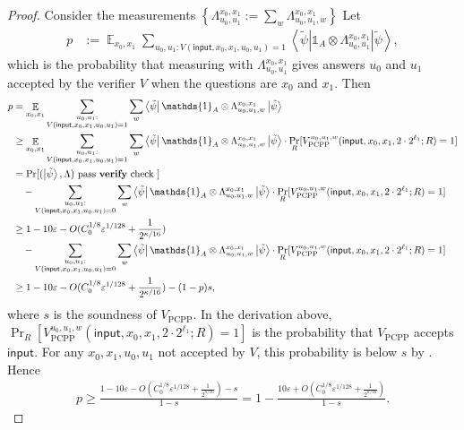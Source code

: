 \documentclass[11pt]{article}
\def\V{\CMcal{V}}
\theoremstyle{plain}
\theoremstyle{definition}
\newcommand {\set} [1] {\ensuremath{ \left\lbrace #1 \right\rbrace }}
\newcommand {\bra} [1] {\ensuremath{ \left\langle #1 \right| }}
\newcommand {\ket} [1] {\ensuremath{ \left| #1 \right\rangle }}
\DeclareMathOperator*{\bigE}{\mathbb{E}}
\newcommand {\id} {\ensuremath{\mathds{1}}}
\newcommand{\ep} {\ensuremath{\varepsilon}}
\newcommand{\x}{\otimes}
\newcommand{\1}{\mathbb{1}} %
\newcommand{\tpsi}{\tilde{\psi}}
\newcommand{\PCPP}{\mathrm{PCPP}}
\newcommand{\ipt}{\mathsf{input}}
\begin{document}
\begin{proof}
Consider the measurements $\set{ \Lambda^{x_0, x_1}_{u_0, u_1} := \sum_w \Lambda^{x_0,x_1}_{u_0,u_1,w}}$
Let
\begin{align*}
	p &:= \bigE_{x_0,x_1} \sum_{u_0, u_1: V(\ipt, x_0,x_1,u_0,u_1)=1} \bra{\tpsi} \id_A \x \Lambda^{x_0,x_1}_{u_0,u_1} \ket{\tpsi},
\end{align*}
which is the probability that measuring with $\Lambda^{x_0, x_1}_{u_0, u_1}$ gives answers 
$u_0$ and $u_1$ accepted by the verifier $V$ when the questions are $x_0$ and $x_1$.
Then
\begin{align*}
	 p &= \bigE_{x_0,x_1} \sum_{\substack{u_0,u_1: \\ V(\ipt, x_0,x_1,u_0,u_1)=1}}
	 \sum_{w}
	   \bra{\tpsi} \id_A \x \Lambda^{x_0,x_1}_{u_0,u_1,w} \ket{\tpsi} \\
	&\geq \bigE_{x_0,x_1} \sum_{\substack{u_0,u_1: \\ V(\ipt, x_0,x_1,u_0,u_1)=1}}
	 \sum_{w} \bra{\tpsi} \id_A \x \Lambda^{x_0,x_1}_{u_0,u_1,w} \ket{\tpsi} \cdot 
	\Pr_R[V_{\PCPP}^{u_0,u_1,w}(\ipt,x_0,x_1,2\cdot 2^{\ell_1}; R)=1]\\
	&= \Pr[(\ket{\tpsi}, \Lambda) \text{ pass \textbf{verify} check }]  \\
	&\quad-  \sum_{\substack{u_0,u_1: \\V(\ipt, x_0,x_1,u_0,u_1)=0}} \sum_w\bra{\tpsi} \id_A \x \Lambda^{x_0,x_1}_{u_0,u_1,w} \ket{\tpsi} \cdot 
	\Pr_R[V^{u_0,u_1,w}_{\PCPP}(\ipt, x_0, x_1, 2\cdot 2^{\ell_1}; R)=1]\\
	&\geq 1 - 10 \ep - O(C_0^{1/8}\ep^{1/128} + \frac{1}{2^{\kappa/16}}) \\
	&\quad - \sum_{\substack{u_0,u_1:\\ V(\ipt, x_0,x_1,u_0,u_1)=0}} \sum_w \bra{\tpsi}  \id_A \x \Lambda^{x_0,x_1}_{u_0,u_1,w} \ket{\tpsi} \cdot 
	\Pr_R[V^{u_0,u_1,w}_{\PCPP}(\ipt,x_0,x_1,2\cdot 2^{\ell_1};R)=1] \\
	&\geq 1 - 10 \ep - O(C_0^{1/8}\ep^{1/128} + \frac{1}{2^{\kappa/16}}) - (1-p)s,
\end{align*}
where $s$ is the soundness of $V_{\PCPP}$.
In the derivation above, $\Pr_R[V^{u_0,u_1,w}_{\PCPP}(\ipt, x_0, x_1, 2\cdot 2^{\ell_1}; R)=1]$ is the probability that $V_{\PCPP}$
accepts $\ipt$.
For any $x_0,x_1,u_0,u_1$ not accepted by $V$, this probability is below $s$ by \cite[Proposition 17.8]{neexp}.
Hence
\begin{align*}
	p \geq \frac{ 1 - 10 \ep -O(C_0^{1/8}\ep^{1/128} + \frac{1}{2^{\kappa/16}}) - s }{1 - s} = 1 - \frac{10\ep+O(C_0^{1/8}\ep^{1/128} + \frac{1}{2^{\kappa/16}}) }{1 - s}.
\end{align*}


\end{proof}
\end{document}
